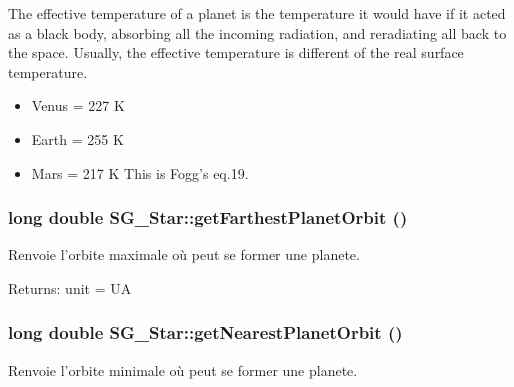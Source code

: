 The effective temperature of a planet is the temperature it would have if it acted as a black body, absorbing all the incoming radiation, and reradiating all back to the space. Usually, the effective temperature is different of the real surface temperature.\begin{itemize}
\item Venus = 227 K\item Earth = 255 K\item Mars = 217 K This is Fogg's eq.19. 
\end{itemize}
\subsubsection{\setlength{\rightskip}{0pt plus 5cm}long double SG\_\-Star::get\-Farthest\-Planet\-Orbit ()}\label{class_s_g___star_a13}


Renvoie l'orbite maximale o\`{u} peut se former une planete. 

\begin{Desc}
\item[Returns:]unit = UA \end{Desc}
\subsubsection{\setlength{\rightskip}{0pt plus 5cm}long double SG\_\-Star::get\-Nearest\-Planet\-Orbit ()}\label{class_s_g___star_a11}


Renvoie l'orbite minimale o\`{u} peut se former une planete. 


